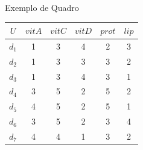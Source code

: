 \begin{quadro}
  \begin{center}
    \caption{Exemplo de Quadro} 
    \label{tab:exemplo}
    \vspace{0.2cm}
    \footnotesize
    \begin{tabular}{|c|c|c|c|c|c|}
      \hline
      $U$ & $vitA$ & $vitC$ & $vitD$ & $prot$ & $lip$ \\
      \hline
      \hline
      $d_1$ & 1 & 3 & 4 & 2 & 3\\
      $d_2$ & 1 & 3 & 3 & 3 & 2\\
      $d_3$ & 1 & 3 & 4 & 3 & 1\\
      $d_4$ & 3 & 5 & 2 & 5 & 2\\
      $d_5$ & 4 & 5 & 2 & 5 & 1\\
      $d_6$ & 3 & 5 & 2 & 3 & 4\\
      $d_7$ & 4 & 4 & 1 & 3 & 2\\
      \hline 
    \end{tabular}
  \end{center}
\end{quadro}


